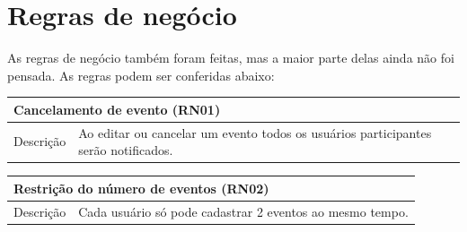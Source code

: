 \documentclass{article}
\begin{document}
	\section{Regras de negócio} 
	
	As regras de negócio também foram feitas, mas a maior parte delas ainda não foi pensada. As regras podem ser conferidas abaixo:

	\begin{center}
   	 \begin{tabular}{|l|l|}
	\hline
 	\multicolumn{2}{|p{\textwidth}|}{
		{\large \textbf{Cancelamento de evento (RN01)}}
	}  \\
	\hline

	Descrição & Ao editar ou cancelar um evento todos os usuários participantes serão notificados. \\ 
   
    	\hline
   	 \end{tabular} 
    	\end{center}

	\begin{center}
   	 \begin{tabular}{|l|l|}
	\hline
 	\multicolumn{2}{|p{\textwidth}|}{
		{\large \textbf{Restrição do número de eventos (RN02)}}
	}  \\
	\hline

	Descrição & Cada usuário só pode cadastrar 2 eventos ao mesmo tempo. \\ 
   
    	\hline
   	 \end{tabular} 
    	\end{center}
	
	


\begin{easylist}[articletoc]
\end{easylist}
\end{document}
